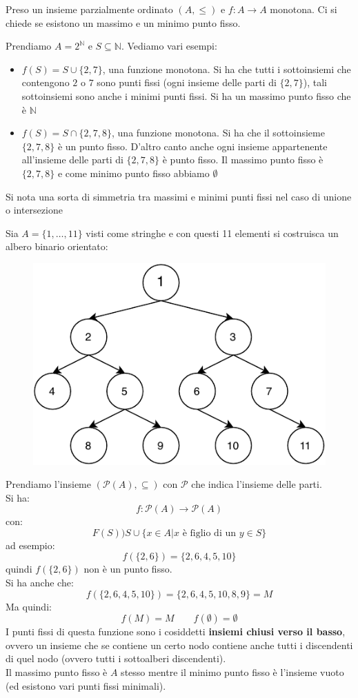 \documentclass[a4paper,12pt, oneside]{book}
\begin{document}
Preso un insieme parzialmente ordinato $(A,\leq)$ e $f:A\to A$ monotona. Ci si
chiede se esistono un massimo e un minimo punto fisso.
\begin{esempio}
  Prendiamo $A=2^\mathbb{N}$ e $S\subseteq \mathbb{N}$. Vediamo vari esempi:
  \begin{itemize}
    \item $f(S)=S\cup\{2,7\}$, una funzione monotona. Si ha che tutti i
    sottoinsiemi che contengono $2$ o $7$ sono punti fissi (ogni insieme delle
    parti di $\{2,7\}$), tali sottoinsiemi
    sono anche i minimi punti fissi. Si ha un massimo punto fisso che è
    $\mathbb{N}$
    \item $f(S)=S\cap\{2,7,8\}$, una funzione monotona. Si ha che il
    sottoinsieme $\{2,7,8\}$ è un punto fisso. D'altro canto anche ogni insieme
    appartenente all'insieme delle parti di $\{2,7,8\}$ è punto fisso. Il
    massimo punto fisso è $\{2,7,8\}$ e come minimo punto fisso abbiamo
    $\emptyset$ 
  \end{itemize}
  Si nota una sorta di simmetria tra massimi e minimi punti fissi nel caso di
  unione o intersezione
\end{esempio}
\begin{esempio}
  Sia $A=\{1,\ldots,11\}$ visti come stringhe e con questi 11 elementi si
  costruisca un albero binario orientato: 
  \begin{figure}[H]
    \centering
    \includegraphics[scale = 0.9]{img/tree.pdf}
  \end{figure}
  Prendiamo l'insieme
  $(\mathcal{P}(A),\subseteq)$ con $\mathcal{P}$ che indica l'insieme delle
  parti.\\
  Si ha:
  \[f:\mathcal{P}(A)\to \mathcal{P}(A)\]
  con:
  \[F(S))S\cup\{x\in A|x\mbox{ è figlio di un }y\in S\}\]
  ad esempio:
  \[f(\{2,6\})=\{2,6,4,5,10\}\]
  quindi $f(\{2,6\})$ non è un punto fisso.\\
  Si ha anche che:
  \[f(\{2,6,4,5,10\})=\{2,6,4,5,10,8,9\}=M\]
  Ma quindi:
  \[f(M)=M\qquad f(\emptyset)=\emptyset\]
  I punti fissi di questa funzione sono i cosiddetti \textbf{insiemi chiusi
    verso il basso}, ovvero un insieme che se contiene un certo nodo contiene
  anche tutti i discendenti di quel nodo (ovvero tutti i sottoalberi
  discendenti).\\
  Il massimo punto fisso è $A$ stesso mentre il minimo punto fisso è l'insieme
  vuoto (ed esistono vari punti fissi minimali).
  \label{es:k}
\end{esempio}
\end{document}
